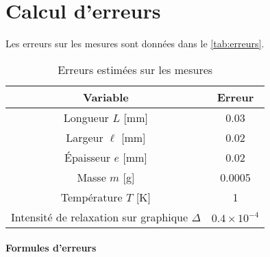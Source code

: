 \section{Calcul d'erreurs}
\label{sec:erreurs}

Les erreurs sur les mesures sont données dans le \autoref{tab:erreurs}.

\begin{table}[h]
    \centering
    \begin{tabulary}{\textwidth}{C C}
        \toprule
        Variable & Erreur \\
        \midrule
        Longueur \(L\) [\si{\milli\meter}] & 0.03 \\
        Largeur \(\ell\) [\si{\milli\meter}] & 0.02 \\
        Épaisseur \(e\) [\si{\milli\meter}] & 0.02 \\
        Masse \(m\) [\si{\gram}] & 0.0005 \\
        Température \(T\) [\si{\kelvin}] & 1 \\
        Intensité de relaxation sur graphique \(\Delta\) & \(0.4 \times 10^{-4}\) \\
        \bottomrule
    \end{tabulary}
    \caption{Erreurs estimées sur les mesures}
    \label{tab:erreurs}
\end{table}




\paragraph*{Formules d'erreurs}

